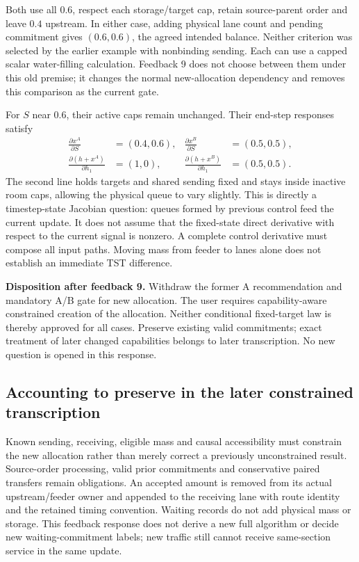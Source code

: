 \documentclass[11pt]{article}
\begin{document}
Both use all $0.6$, respect each storage/target cap, retain source-parent order and leave $0.4$ upstream. In either case, adding physical lane count and pending commitment gives $(0.6,0.6)$, the agreed intended balance. Neither criterion was selected by the earlier example with nonbinding sending. Each can use a capped scalar water-filling calculation. Feedback 9 does not choose between them under this old premise; it changes the normal new-allocation dependency and removes this comparison as the current gate.

For $S$ near $0.6$, their active caps remain unchanged. Their end-step responses satisfy
\begin{align}
 \frac{\partial x^A}{\partial S}&=(0.4,0.6),&
 \frac{\partial x^B}{\partial S}&=(0.5,0.5),
 \label{eq:admission-sending-response}\\
 \frac{\partial(h+x^A)}{\partial h_1}&=(1,0),&
 \frac{\partial(h+x^B)}{\partial h_1}&=(0.5,0.5).
 \label{eq:admission-queue-response}
\end{align}
The second line holds targets and shared sending fixed and stays inside inactive room caps, allowing the physical queue to vary slightly. This is directly a timestep-state Jacobian question: queues formed by previous control feed the current update. It does not assume that the fixed-state direct derivative with respect to the current signal is nonzero. A complete control derivative must compose all input paths. Moving mass from feeder to lanes alone does not establish an immediate TST difference.

\textbf{Disposition after feedback 9.} Withdraw the former A recommendation and mandatory A/B gate for new allocation. The user requires capability-aware constrained creation of the allocation. Neither conditional fixed-target law is thereby approved for all cases. Preserve existing valid commitments; exact treatment of later changed capabilities belongs to later transcription. No new question is opened in this response.

\subsection*{Accounting to preserve in the later constrained transcription}

Known sending, receiving, eligible mass and causal accessibility must constrain the new allocation rather than merely correct a previously unconstrained result. Source-order processing, valid prior commitments and conservative paired transfers remain obligations. An accepted amount is removed from its actual upstream/feeder owner and appended to the receiving lane with route identity and the retained timing convention. Waiting records do not add physical mass or storage. This feedback response does not derive a new full algorithm or decide new waiting-commitment labels; new traffic still cannot receive same-section service in the same update.
\end{document}

